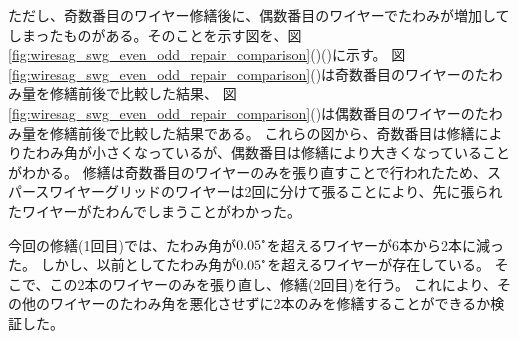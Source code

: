\documentclass[../../main.tex]{subfiles}
\begin{document}
ただし、奇数番目のワイヤー修繕後に、偶数番目のワイヤーでたわみが増加してしまったものがある。そのことを示す図を、図\ref{fig:wiresag_swg_even_odd_repair_comparison}()()に示す。
図\ref{fig:wiresag_swg_even_odd_repair_comparison}()は奇数番目のワイヤーのたわみ量を修繕前後で比較した結果、
図\ref{fig:wiresag_swg_even_odd_repair_comparison}()は偶数番目のワイヤーのたわみ量を修繕前後で比較した結果である。
これらの図から、奇数番目は修繕によりたわみ角が小さくなっているが、偶数番目は修繕により大きくなっていることがわかる。
修繕は奇数番目のワイヤーのみを張り直すことで行われたため、スパースワイヤーグリッドのワイヤーは2回に分けて張ることにより、先に張られたワイヤーがたわんでしまうことがわかった。

今回の修繕(1回目)では、たわみ角が$0.05\tcdegree$を超えるワイヤーが6本から2本に減った。
しかし、以前としてたわみ角が$0.05\tcdegree$を超えるワイヤーが存在している。
そこで、この2本のワイヤーのみを張り直し、修繕(2回目)を行う。
これにより、その他のワイヤーのたわみ角を悪化させずに2本のみを修繕することができるか検証した。
\end{document}
